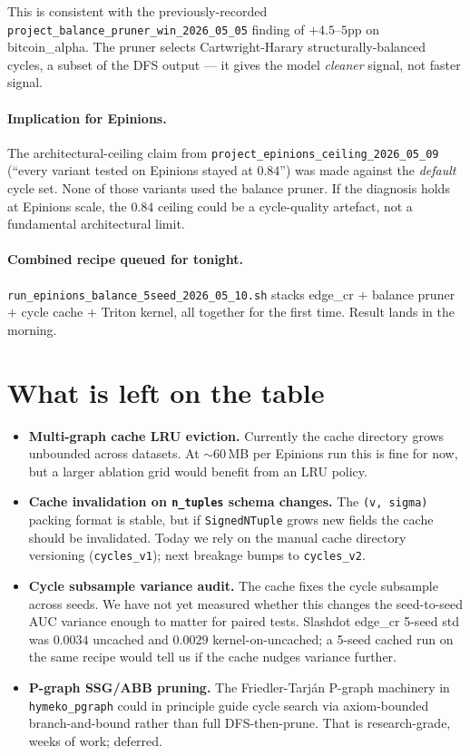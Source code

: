 \documentclass[11pt,a4paper]{article}
\begin{document}
This is consistent with the previously-recorded
\texttt{project\_balance\_pruner\_win\_2026\_05\_05} finding of
$+4.5$--$5$pp on bitcoin\_alpha.  The pruner selects
Cartwright-Harary structurally-balanced cycles, a subset of the
DFS output --- it gives the model \emph{cleaner} signal, not faster
signal.

\paragraph{Implication for Epinions.} The architectural-ceiling
claim from \texttt{project\_epinions\_ceiling\_2026\_05\_09}
(``every variant tested on Epinions stayed at $0.84$'') was made
against the \emph{default} cycle set.  None of those variants used
the balance pruner.  If the diagnosis holds at Epinions scale, the
$0.84$ ceiling could be a cycle-quality artefact, not a
fundamental architectural limit.

\paragraph{Combined recipe queued for tonight.}
\texttt{run\_epinions\_balance\_5seed\_2026\_05\_10.sh} stacks
edge\_cr $+$ balance pruner $+$ cycle cache $+$ Triton kernel, all
together for the first time.  Result lands in the morning.

\section{What is left on the table}

\begin{itemize}[leftmargin=*]
\item \textbf{Multi-graph cache LRU eviction.}  Currently the
  cache directory grows unbounded across datasets.  At
  $\sim 60\,$MB per Epinions run this is fine for now, but a
  larger ablation grid would benefit from an LRU policy.
\item \textbf{Cache invalidation on \texttt{n\_tuples} schema
  changes.}  The \texttt{(v, sigma)} packing format is stable, but
  if \texttt{SignedNTuple} grows new fields the cache should be
  invalidated.  Today we rely on the manual cache directory
  versioning (\texttt{cycles\_v1}); next breakage bumps to
  \texttt{cycles\_v2}.
\item \textbf{Cycle subsample variance audit.}  The cache fixes
  the cycle subsample across seeds.  We have not yet measured
  whether this changes the seed-to-seed AUC variance enough to
  matter for paired tests.  Slashdot edge\_cr 5-seed std was
  $0.0034$ uncached and $0.0029$ kernel-on-uncached; a 5-seed
  cached run on the same recipe would tell us if the cache nudges
  variance further.
\item \textbf{P-graph SSG/ABB pruning.}  The Friedler-Tarján
  P-graph machinery in \texttt{hymeko\_pgraph} could in principle
  guide cycle search via axiom-bounded branch-and-bound rather
  than full DFS-then-prune.  That is research-grade, weeks of
  work; deferred.
\end{itemize}
\end{document}
